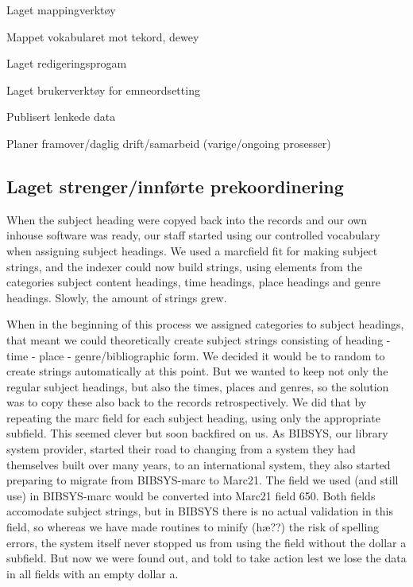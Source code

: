 Laget mappingverktøy

Mappet vokabularet mot tekord, dewey

Laget redigeringsprogam 

Laget brukerverktøy for emneordsetting

Publisert lenkede data

Planer framover/daglig drift/samarbeid (varige/ongoing prosesser)

\subsection{Laget strenger/innførte prekoordinering}

When the subject heading were copyed back into the records and our own inhouse software was ready, our staff started using our controlled vocabulary when assigning subject headings. We used a marcfield fit for making subject strings, and the indexer could now build strings, using elements from the categories subject content headings, time headings, place headings and genre headings. Slowly, the amount of strings grew. 

When in the beginning of this process we assigned categories to subject headings, that meant we could theoretically create subject strings consisting of heading - time - place - genre/bibliographic form. We decided it would be to random to create strings automatically at this point. But we wanted to keep not only the regular subject headings, but also the times, places and genres, so the solution was to copy these also back to the records retrospectively. We did that by repeating the marc field for each subject heading, using only the appropriate subfield. This seemed clever but soon backfired on us. As BIBSYS, our library system provider, started their road to changing from a system they had themselves built over many years, to an international system, they also started preparing to migrate from BIBSYS-marc to Marc21. The field we used (and still use) in BIBSYS-marc would be converted into Marc21 field 650. Both fields accomodate subject strings, but in BIBSYS there is no actual validation in this field, so whereas we have made routines to minify (hæ??) the risk of spelling errors, the system itself never stopped us from using the field without the dollar a subfield. But now we were found out, and told to take action lest we lose the data in all fields with an empty dollar a. 

